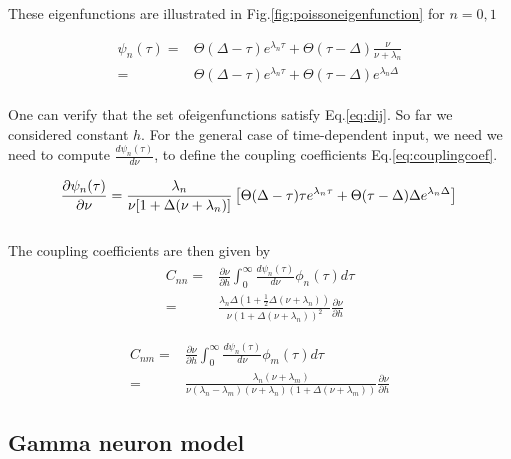 \documentclass[12pt,twoside]{report}
\begin{document}
These eigenfunctions are illustrated in Fig.\ref{fig:poissoneigenfunction} for $n=0,1$

\begin{align}
\psi_n(\tau)=&\Theta(\Delta-\tau)e^{\lambda_n\tau} +  \Theta(\tau-\Delta) \frac{\nu}{\nu+\lambda_n}\nonumber\\
=&\Theta(\Delta-\tau)e^{\lambda_n\tau} +  \Theta(\tau-\Delta)e^{\lambda_n\Delta}
\end{align}\\

One can verify that the set ofeigenfunctions satisfy Eq.\eqref{eq:dij}.
So far we considered constant $h$. For the general case of time-dependent input, we need we need to compute $\frac{d\psi_n(\tau)}{d\nu}$, to define the coupling coefficients Eq.\eqref{eq:couplingcoef}. 

\begin{equation}
\frac{\partial\psi_n(\tau)}{\partial\nu}=\frac{\lambda_n}{\nu[1+\Delta(\nu+\lambda_n)]}\left[\Theta(\Delta-\tau)\tau e^{\lambda_n\tau} +  \Theta(\tau-\Delta)\Delta e^{\lambda_n\Delta}\right]\\
\end{equation}\\

The coupling coefficients are then given by
\begin{align}
C_{nn}=&\frac{\partial \nu}{\partial h}\int_0^\infty\frac{d\psi_n(\tau)}{d\nu}\phi_n(\tau)d\tau \nonumber\\
=&\frac{\lambda_n\Delta(1+\frac{1}{2}\Delta(\nu+\lambda_n))}{\nu(1+\Delta(\nu+\lambda_n))^2}\frac{\partial \nu}{\partial h}
\end{align}


\begin{align}
C_{nm}=&\frac{\partial \nu}{\partial h}\int_0^\infty\frac{d\psi_n(\tau)}{d\nu}\phi_m(\tau)d\tau \nonumber\\
=&\frac{\lambda_n(\nu+\lambda_m)}{\nu(\lambda_n-\lambda_m)(\nu+\lambda_n)(1+\Delta(\nu+\lambda_m))}\frac{\partial \nu}{\partial h}
\end{align}




\subsection{Gamma neuron model}
\end{document}
